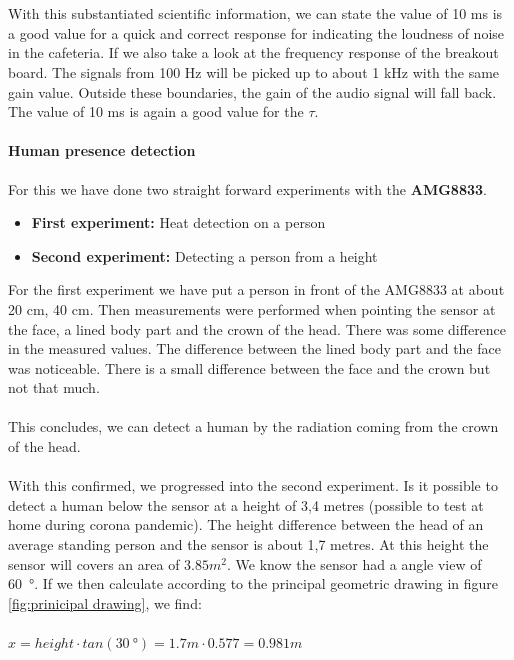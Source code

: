 \documentclass[11pt,a4paper]{article}
\begin{document}
\\ \\ With this substantiated scientific information, we can state the value of 10 ms is a good value for a quick and correct response for indicating the loudness of noise in the cafeteria. If we also take a look at the frequency response of the breakout board. The signals from 100 Hz will be picked up to about 1 kHz with the same gain value. Outside these boundaries, the gain of the audio signal will fall back. The value of 10 ms is again a good value for the $\tau$.


\paragraph{Human presence detection}\label{sec:amg}
For this we have done two straight forward experiments with the \textbf{AMG8833}.
\begin{itemize}
\item \textbf{First experiment:} Heat detection on a person
\item \textbf{Second experiment:} Detecting a person from a height
\end{itemize}
For the first experiment we have put a person in front of the AMG8833 at about 20 cm, 40 cm. Then measurements were performed when pointing the sensor at the face, a lined body part and the crown of the head. There was some difference in the measured values. The  difference between the lined body part and the face was noticeable. There is a small difference between the face and the crown but not that much. 
\\ \\ 
This concludes, we can detect a human by the radiation coming from the crown of the head.
\\ \\
With this confirmed, we progressed into the second experiment. Is it possible to detect a human below the sensor at a height of 3,4 metres (possible to test at home during corona pandemic). The height difference between the head of an average standing person and the sensor is about 1,7 metres. At this height the sensor will covers an area of $3.85 m^2$. We know the sensor had a angle view of \SI{60}{\degree}. If we then calculate according to the principal geometric drawing in figure \ref{fig:prinicipal drawing},  we find:
\\ \\
$ x = height \cdot tan (\SI{30}{\degree}) = 1.7 m \cdot 0.577 = 0.981 m$
\\ \\
\end{document}
